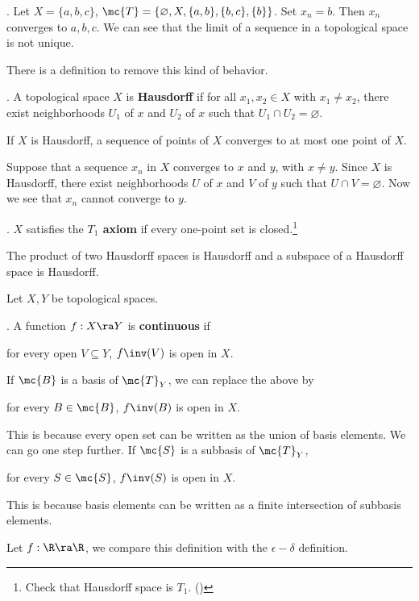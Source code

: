 \ex. Let \(X = \{a, b, c\}\), \(\mc{T} = \{\varnothing, X, \{a, b\}, \{b, c\}, \{b\}\}\). Set \(x_n = b\). Then \(x_n\) converges to \(a, b, c\). We can see that the limit of a sequence in a topological space is not unique.

There is a definition to remove this kind of behavior.

.  A topological space \(X\) is \textbf{Hausdorff} if for all \(x_1, x_2 \in X\) with \(x_1 \neq x_2\), there exist neighborhoods \(U_1\) of \(x\) and \(U_2\) of \(x\) such that \(U_1 \cap U_2 = \varnothing\).

 If \(X\) is Hausdorff, a sequence of points of \(X\) converges to at most one point of \(X\).

\pf Suppose that a sequence \(x_n\) in \(X\) converges to \(x\) and \(y\), with \(x \neq y\). Since \(X\) is Hausdorff, there exist neighborhoods \(U\) of \(x\) and \(V\) of \(y\) such that \(U \cap V = \varnothing\). Now we see that \(x_n\) cannot converge to \(y\).

. \(X\) satisfies the \textbf{\(T_1\) axiom} if every one-point set is closed.\footnote{Check that Hausdorff space is \(T_1\). ()}

 The product of two Hausdorff spaces is Hausdorff and a subspace of a Hausdorff space is Hausdorff.


Let \(X, Y\) be topological spaces.

.  A function \(f : X \ra Y\) is \textbf{continuous} if
\begin{center}
    for every open \(V \subseteq Y\), \(f\inv(V)\) is open in \(X\).
\end{center}

\rmk If \(\mc{B}\) is a basis of \(\mc{T}_Y\), we can replace the above by
\begin{center}
    for every \(B \in \mc{B}\), \(f\inv(B)\) is open in \(X\).
\end{center}
This is because every open set can be written as the union of basis elements. We can go one step further. If \(\mc{S}\) is a subbasis of \(\mc{T}_Y\),
\begin{center}
    for every \(S \in \mc{S}\), \(f\inv(S)\) is open in \(X\).
\end{center}
This is because basis elements can be written as a finite intersection of subbasis elements.

\rmk Let \(f : \R \ra \R\), we compare this definition with the \(\epsilon-\delta\) definition.

